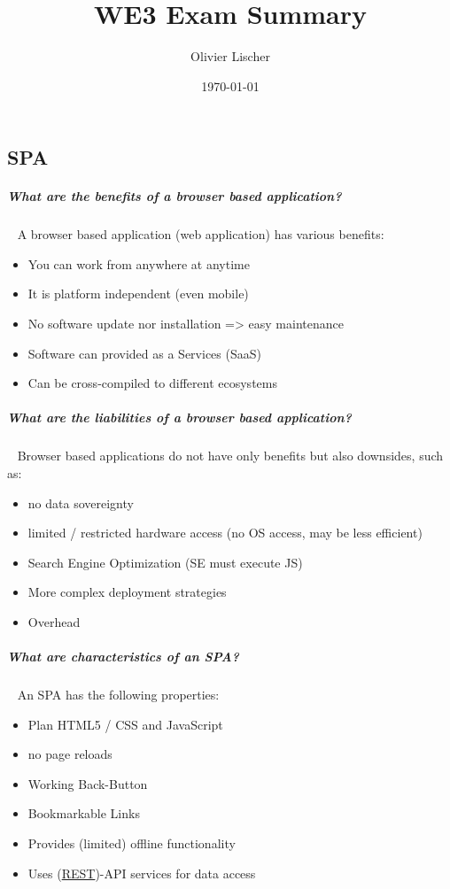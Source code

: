 \documentclass[10pt,twoside,landscape]{article}
\author{Olivier Lischer}
\date{\today}
\title{WE3 Exam Summary}
\begin{document}
\pagestyle{fancy}
\fancyhf{}
\fancyfoot[CE,CO]{\leftmark}
\fancyfoot[R]{\thepage}

\begin{multicols}{4}
\section{SPA}
\label{sec:org261e7bb}
\subparagraph{What are the benefits of a browser based application?} \
\label{sec:org1214653}
A browser based application (web application) has various benefits:
\begin{itemize}
\item You can work from anywhere at anytime
\item It is platform independent (even mobile)
\item No software update nor installation => easy maintenance
\item Software can provided as a Services (SaaS)
\item Can be cross-compiled to different ecosystems
\end{itemize}
\subparagraph{What are the liabilities of a browser based application?} \
\label{sec:org80b24fd}
Browser based applications do not have only benefits but also downsides, such as:
\begin{itemize}
\item no data sovereignty
\item limited / restricted hardware access (no OS access, may be less efficient)
\item Search Engine Optimization (SE must execute JS)
\item More complex deployment strategies
\item Overhead
\end{itemize}
\subparagraph{What are characteristics of an SPA?} \
\label{sec:orgef02694}
An SPA has the following properties:
\begin{itemize}
\item Plan HTML5 / CSS and JavaScript
\item no page reloads
\item Working Back-Button
\item Bookmarkable Links
\item Provides (limited) offline functionality
\item Uses (\href{../../../roam/20230108172748-what_is_rest.org}{REST})-API services for data access
\end{itemize}

\end{multicols}
\end{document}

